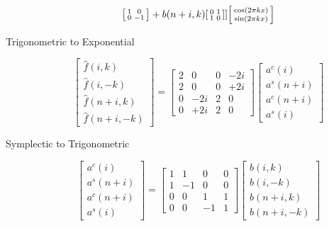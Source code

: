 \documentclass[../main-v2-manifolds.tex]{subfiles}
\begin{document}
\begin{description}
\begin{equation}
\begin{bsmallmatrix}
            1 & 0 \\
            0 & -1 
        \end{bsmallmatrix} + b(n+i,k)\begin{bsmallmatrix}
            0 & 1 \\
            1 & 0 
        \end{bsmallmatrix}]\begin{bsmallmatrix}
            \cos(2\pi k x) \\ 
            \sin(2\pi k x)
        \end{bsmallmatrix}
    \end{equation}
    \item[Trigonometric to Exponential]
    \[
        \begin{bmatrix}
            \hat{f}(i,k) \\
            \hat{f}(i,-k) \\
            \hat{f}(n+i,k) \\
            \hat{f}(n+i,-k)
        \end{bmatrix} = \begin{bmatrix}
            2 & 0 & 0 & -2i \\
            2 & 0 & 0 & +2i \\
            0 & -2i & 2 & 0 \\
            0 & +2i & 2 & 0 
        \end{bmatrix}\begin{bmatrix}
            a^c(i) \\
            a^s(n+i) \\
            a^c(n+i) \\ 
            a^s(i)
        \end{bmatrix}
    \]
    \item[Symplectic to Trigonometric]
    \[
        \begin{bmatrix}
            a^c(i) \\
            a^s(n+i) \\ 
            a^c(n+i) \\ 
            a^s(i)  
        \end{bmatrix} = \begin{bmatrix}
            1 & 1 & 0 & 0 \\
            1 & -1 & 0 & 0 \\
            0 & 0 & 1 & 1 \\
            0 & 0 & -1 & 1 
        \end{bmatrix}\begin{bmatrix}
            b(i,k) \\
            b(i,-k) \\
            b(n+i,k) \\
            b(n+i,-k) 
        \end{bmatrix}
    \]
\end{description}
\end{document}
